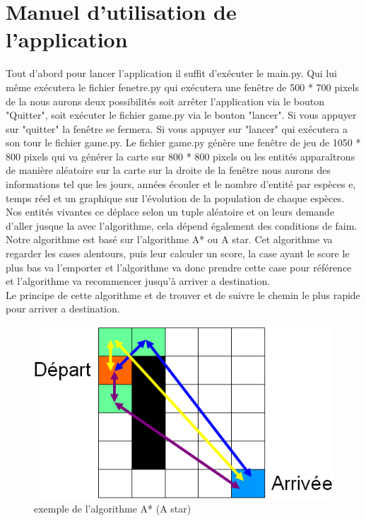 \documentclass[a4paper, 11pt]{article}
\begin{document}
\newpage

\section{Manuel d'utilisation de l'application }

Tout d'abord pour lancer l'application il suffit d’exécuter le main.py. Qui lui même exécutera le fichier fenetre.py qui exécutera une fenêtre de 500 * 700 pixels de la nous aurons deux possibilités soit arrêter l'application via le bouton "Quitter", soit exécuter le fichier game.py via le bouton "lancer". Si vous appuyer sur "quitter" la fenêtre se fermera. Si vous appuyer sur "lancer" qui exécutera a son tour le fichier game.py. Le fichier game.py génère une fenêtre de jeu de 1050 * 800 pixels qui va générer la carte sur 800 * 800 pixels ou les entités apparaîtrons de manière aléatoire sur la carte
sur la droite de la fenêtre nous aurons des informations tel que les jours, années écouler et le nombre d'entité par espèces e, temps réel et un graphique sur l'évolution de la population de chaque espèces.\\
Nos entités vivantes ce déplace selon un tuple aléatoire et on leurs demande d'aller jusque la avec l'algorithme, cela dépend également des conditions de faim.\\
Notre algorithme est basé sur l'algorithme A* ou A star. Cet algorithme va regarder les cases alentours, puis leur calculer un score, la case ayant le score le plus bas va l'emporter et l'algorithme va donc prendre cette case pour référence et l'algorithme va recommencer jusqu'à arriver a destination.\\
Le principe de cette algorithme et de trouver et de suivre le chemin le plus rapide pour arriver a destination.
\begin{figure}[ht!]
 \centering
 \includegraphics[width=\linewidth]{images/exemple_algo-A*.png}
 \caption{exemple de l'algorithme A* (A star)}
 \label{fig::example::one}
\end{figure}
\newpage
\end{document}
